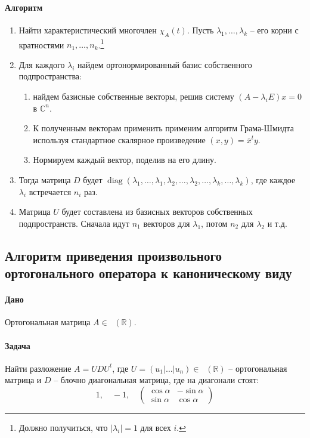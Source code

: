 \documentclass{article}
\newcommand{\Matrix}[2]{\mathop{\mathrm{M}_{#2}}(#1)}
\newcommand{\diag}{\operatorname{diag}}
\begin{document}
\paragraph{Алгоритм} 
\begin{enumerate}
\item Найти характеристический многочлен $\chi_A(t)$. Пусть $\lambda_1,\ldots, \lambda_k$ -- его корни с кратностями $n_1,\ldots,n_k$.\footnote{Должно получиться, что $|\lambda_i| = 1$ для всех $i$.}

\item Для каждого $\lambda_i$ найдем ортонормированный базис собственного подпространства:
\begin{enumerate}
\item найдем базисные собственные векторы, решив систему $(A - \lambda_iE)x = 0$ в $\mathbb C^n$.

\item К полученным векторам применить применим алгоритм Грама-Шмидта используя стандартное скалярное произведение $(x, y) = \bar x^t y$.

\item Нормируем каждый вектор, поделив на его длину.
\end{enumerate}

\item Тогда матрица $D$ будет $\diag(\lambda_1,\ldots,\lambda_1,\lambda_2,\ldots,\lambda_2,\ldots,\lambda_k,\ldots,\lambda_k)$, где каждое $\lambda_i$ встречается $n_i$ раз.

\item Матрица $U$ будет составлена из базисных векторов собственных подпространств. Сначала идут $n_1$ векторов для $\lambda_1$, потом $n_2$ для $\lambda_2$ и т.д.
\end{enumerate}

\subsection{Алгоритм приведения произвольного ортогонального оператора к каноническому виду}

\paragraph{Дано} Ортогональная матрица $A\in \Matrix{\mathbb R}{n}$.

\paragraph{Задача} Найти разложение $A = U D U^t$, где $U = (u_1|\ldots|u_n)\in \Matrix{\mathbb R}{n}$ -- ортогональная матрица и $D$ -- блочно диагональная матрица, где на диагонали стоят:
\[
1,\quad -1,\quad
\begin{pmatrix}
{\cos \alpha}&{-\sin\alpha}\\
{\sin \alpha}&{\cos \alpha}
\end{pmatrix}
\]
\end{document}
